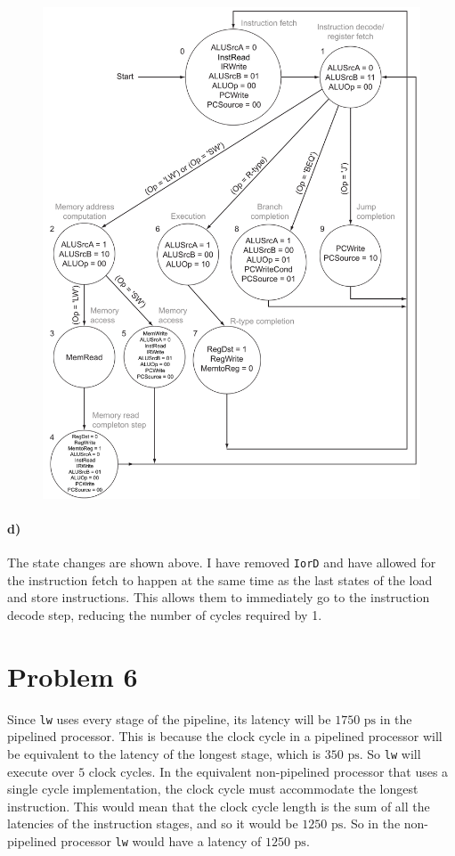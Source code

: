 \documentclass[12pt]{article}
\begin{document}
\begin{figure}[!ht]
    \begin{center}
        \includegraphics[width=4.7in]{problem5d.png}
    \end{center}
\end{figure}

\paragraph{d)}

The state changes are shown above. I have removed \texttt{IorD} and have allowed for the instruction fetch to happen at the same time as the last states
of the load and store instructions. This allows them to immediately go to the instruction decode step, reducing the number of cycles required by 1.

\section*{Problem 6}

Since \texttt{lw} uses every stage of the pipeline, its latency will be \(1750\text{ ps}\) in the pipelined processor. This is because the clock cycle
in a pipelined processor will be equivalent to the latency of the longest stage, which is \(350\text{ ps}\). So \texttt{lw} will execute over \(5\) clock
cycles. In the equivalent non-pipelined processor that uses a single cycle implementation, the clock cycle must accommodate the longest instruction.
This would mean that the clock cycle length is the sum of all the latencies of the instruction stages, and so it would be \(1250\text{ ps}\). So in
the non-pipelined processor \texttt{lw} would have a latency of \(1250\text{ ps}\).
\end{document}
